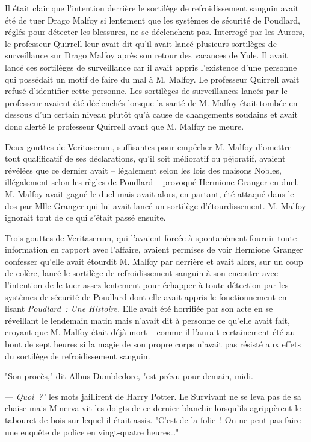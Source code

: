 Il était clair que l'intention derrière le sortilège de refroidissement sanguin avait été de tuer Drago Malfoy si lentement que les systèmes de sécurité de Poudlard, réglés pour détecter les blessures, ne se déclenchent pas. Interrogé par les Aurors, le professeur Quirrell leur avait dit qu'il avait lancé plusieurs sortilèges de surveillance sur Drago Malfoy après son retour des vacances de Yule. Il avait lancé ces sortilèges de surveillance car il avait appris l'existence d'une personne qui possédait un motif de faire du mal à M. Malfoy. Le professeur Quirrell avait refusé d'identifier cette personne. Les sortilèges de surveillances lancés par le professeur avaient été déclenchés lorsque la santé de M. Malfoy était tombée en dessous d'un certain niveau plutôt qu'à cause de changements soudains et avait donc alerté le professeur Quirrell avant que M. Malfoy ne meure.

Deux gouttes de Veritaserum, suffisantes pour empêcher M. Malfoy d'omettre tout qualificatif de ses déclarations, qu'il soit mélioratif ou péjoratif, avaient révélées que ce dernier avait -- légalement selon les lois des maisons Nobles, illégalement selon les règles de Poudlard -- provoqué Hermione Granger en duel. M. Malfoy avait gagné le duel mais avait alors, en partant, été attaqué dans le dos par Mlle Granger qui lui avait lancé un sortilège d'étourdissement. M. Malfoy ignorait tout de ce qui s'était passé ensuite.

Trois gouttes de Veritaserum, qui l'avaient forcée à spontanément fournir toute information en rapport avec l'affaire, avaient permises de voir Hermione Granger confesser qu'elle avait étourdit M. Malfoy par derrière et avait alors, sur un coup de colère, lancé le sortilège de refroidissement sanguin à son encontre avec l'intention de le tuer assez lentement pour échapper à toute détection par les systèmes de sécurité de Poudlard dont elle avait appris le fonctionnement en lisant \emph{Poudlard~: Une Histoire}. Elle avait été horrifiée par son acte en se réveillant le lendemain matin mais n'avait dit à personne ce qu'elle avait fait, croyant que M. Malfoy était déjà mort -- comme il l'aurait certainement été au bout de sept heures si la magie de son propre corps n'avait pas résisté aux effets du sortilège de refroidissement sanguin.

"Son procès," dit Albus Dumbledore, "est prévu pour demain, midi.

--- \emph{Quoi~?"} les mots jaillirent de Harry Potter. Le Survivant ne se leva pas de sa chaise mais Minerva vit les doigts de ce dernier blanchir lorsqu'ils agrippèrent le tabouret de bois sur lequel il était assis. "C'est de la folie~! On ne peut pas faire une enquête de police en vingt-quatre heures…"

